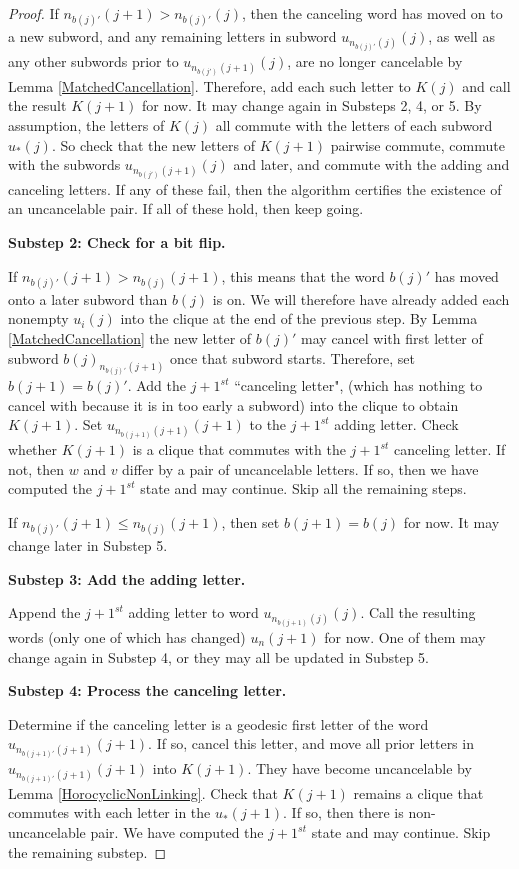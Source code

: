 \documentclass[10pt,a4paper]{amsart}
\theoremstyle{definition}
\theoremstyle{remark}
\begin{document}
\begin{proof}
		If $n_{b(j)'}(j+1)>n_{b(j)'}(j)$, then the canceling word has moved on to a new subword, and any remaining letters in subword $u_{n_{b(j)'}(j)}(j)$, as well as any other subwords prior to $u_{n_{b(j')}(j+1)}(j)$, are no longer cancelable by Lemma \ref{MatchedCancellation}. Therefore, add each such letter to $K(j)$ and call the result $K(j+1)$ for now. It may change again in Substeps 2, 4, or 5. By assumption, the letters of $K(j)$ all commute with the letters of each subword $u_{*}(j)$. So check that the new letters of $K(j+1)$ pairwise commute, commute with the subwords $u_{n_{b(j')}(j+1)}(j)$ and later, and commute with the adding and canceling letters. If any of these fail, then the algorithm certifies the existence of an uncancelable pair. If all of these hold, then keep going.
		
		\textbf{Substep 2: Check for a bit flip.}
		
		If $n_{b(j)'}(j+1)>n_{b(j)}(j+1)$, this means that the word $b(j)'$ has moved onto a later subword than $b(j)$ is on. We will therefore have already added each nonempty $u_i(j)$ into the clique at the end of the previous step. By Lemma \ref{MatchedCancellation} the new letter of $b(j)'$ may cancel with first letter of subword ${b(j)}_{n_{b(j)'}(j+1)}$ once that subword starts. Therefore, set $b(j+1)=b(j)'$. Add the $j+1^{st}$ ``canceling letter", (which has nothing to cancel with because it is in too early a subword) into the clique to obtain $K(j+1)$. Set $u_{n_{b(j+1)}(j+1)}(j+1)$ to the $j+1^{st}$ adding letter. Check whether $K(j+1)$ is a clique that commutes with the $j+1^{st}$ canceling letter. If not, then $w$ and $v$ differ by a pair of uncancelable letters. If so, then we have computed the $j+1^{st}$ state and may continue. Skip all the remaining steps.
		
		If $n_{b(j)'}(j+1)\le n_{b(j)}(j+1)$, then set $b(j+1)=b(j)$ for now. It may change later in Substep 5.
		
		\textbf{Substep 3: Add the adding letter.}
		
		Append the $j+1^{st}$ adding letter to word $u_{n_{b(j+1)}(j)}(j)$. Call the resulting words (only one of which has changed) $u_{n}(j+1)$ for now. One of them may change again in Substep 4, or they may all be updated in Substep 5.
		
		\textbf{Substep 4: Process the canceling letter.}
		
		Determine if the canceling letter is a geodesic first letter of the word $u_{n_{b(j+1)'}(j+1)}(j+1)$. If so, cancel this letter, and move all prior letters in $u_{n_{b(j+1)'}(j+1)}(j+1)$ into $K(j+1)$. They have become uncancelable by Lemma \ref{HorocyclicNonLinking}. Check that $K(j+1)$ remains a clique that commutes with each letter in the $u_{*}(j+1)$. If so, then there is non-uncancelable pair. We have computed the $j+1^{st}$ state and may continue. Skip the remaining substep.
		

\end{proof}
\end{document}
